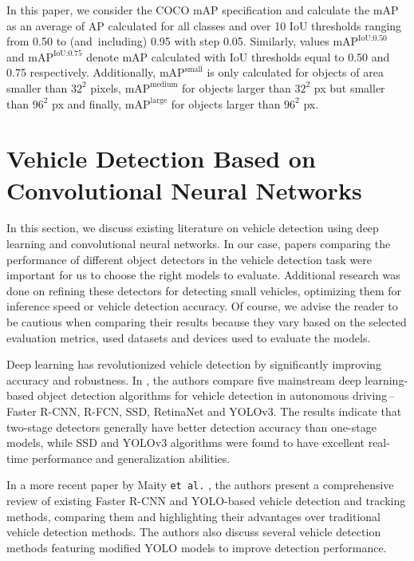 In this paper, we consider the COCO mAP specification and calculate the mAP as
an average of AP calculated for all classes and over 10 IoU thresholds ranging
from \num{0.50} to (and~including) \num{0.95} with step \num{0.05}. Similarly,
values $\text{mAP}^{\text{IoU:0.50}}$ and $\text{mAP}^{\text{IoU:0.75}}$ denote
mAP calculated with IoU thresholds equal to \num{0.50} and \num{0.75}
respectively. Additionally, $\text{mAP}^{\text{small}}$ is only calculated for
objects of area smaller than $32^2$ pixels, $\text{mAP}^{\text{medium}}$ for
objects larger than $32^2$ px but smaller than $96^2$ px and finally,
$\text{mAP}^{\text{large}}$ for objects larger than $96^2$ px.




\section{Vehicle Detection Based on Convolutional Neural Networks}


In this section, we discuss existing literature on vehicle detection using deep
learning and convolutional neural networks. In our case, papers comparing the
performance of different object detectors in the vehicle detection task were
important for us to choose the right models to evaluate. Additional research was
done on refining these detectors for detecting small vehicles, optimizing them
for inference speed or vehicle detection accuracy. Of course, we advise the
reader to be cautious when comparing their results because they vary based on
the selected evaluation metrics, used datasets and devices used to evaluate the
models.

Deep learning has revolutionized vehicle detection by significantly improving
accuracy and robustness. In \cite{Wang2019}, the authors compare five mainstream
deep learning-based object detection algorithms for vehicle detection in
autonomous driving\,--\,Faster R-CNN, R-FCN, SSD, RetinaNet and YOLOv3. The
results indicate that two-stage detectors generally have better detection
accuracy than one-stage models, while SSD and YOLOv3 algorithms were found to
have excellent real-time performance and generalization abilities. 

In a more recent paper by Maity \texttt{et al.} \cite{Maity2021},
the authors present a comprehensive review of existing Faster R-CNN and
YOLO-based vehicle detection and tracking methods, comparing them and
highlighting their advantages over traditional vehicle detection methods. The
authors also discuss several vehicle detection methods featuring modified YOLO
models to improve detection performance.

